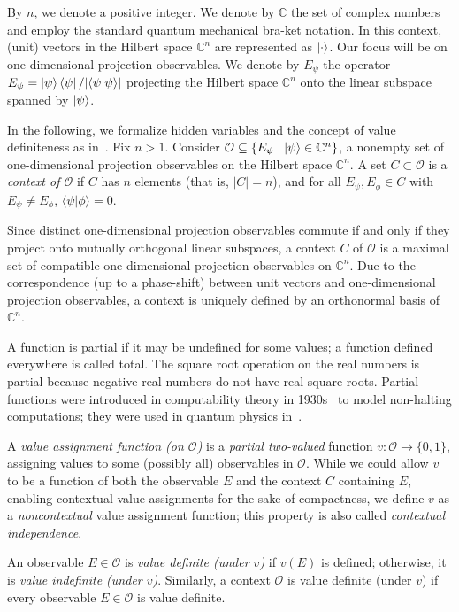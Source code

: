 \documentclass[%
 superscriptaddress,
  preprint,
 showpacs,
 showkeys,
 nofootinbib,
  amsmath,amssymb,
  aps,
 pra,
  longbibliography,
  floatfix,
 ]{revtex4-2}
\theoremstyle{definition}
\newcommand{\C}{\mathbb{C}}
\newcommand{\iprod}[2]{\langle #1 | #2 \rangle}
\begin{document}
By $n$, we denote a positive integer.
We denote by $\C$ the set of complex numbers and employ the standard quantum mechanical bra-ket notation. In this context, (unit) vectors in the Hilbert space $\C^n$ are represented as $\ket{\cdot}$.
Our focus will be on one-dimensional projection observables.
We denote by $E_\psi$ the operator $E_\psi=\ket{\psi}\bra{\psi}/\vert \iprod{\psi}{\psi}\vert$ projecting the Hilbert space $\C^n$ onto the linear subspace spanned by $\ket{\psi}$.


In the following, we formalize hidden variables and the concept of value definiteness as in~\cite{2015-AnalyticKS}.
Fix $n>1$. Consider $\mathcal{O} \subseteq \{ E_\psi \mid \ket{\psi} \in \mathbb{C}^n \}$, a nonempty set of one-dimensional projection observables on the Hilbert space $\mathbb{C}^n$.
        A set $C \subset \mathcal{O}$ is a {\it context of $\mathcal{O}$} if $C$ has $n$ elements (that is, $|C|=n$), and for all $E_\psi, E_\phi \in C$ with $E_\psi \neq E_\phi$, $\iprod{\psi}{\phi}=0$.


Since distinct one-dimensional projection observables commute if and only if they project onto mutually orthogonal linear subspaces, a context $C$ of $\mathcal{O}$ is a maximal set of compatible one-dimensional projection observables on $\C^n$. Due to the correspondence (up to a phase-shift) between unit vectors and one-dimensional projection observables, a context is uniquely defined by an orthonormal basis of $\C^n$.

A function is partial if it may be undefined for some values; a function
defined everywhere is called total. The square root operation on the real numbers is partial
 because negative real numbers do not have real square roots.
Partial functions were introduced in
computability theory in 1930s~\cite{davis-58}
to model non-halting computations; they were used in quantum physics in~\cite{2012-incomput-proofsCJ}.

        A {\it value assignment function (on $\mathcal{O}$)} is a {\it partial two-valued} function $v: \mathcal{O} \to \{0,1\}$,
assigning values to some (possibly all) observables in $\mathcal{O}$.
While we could allow $v$ to be a function of both the observable $E$ and the context $C$ containing $E$,
enabling contextual value assignments for the sake of compactness,
we define $v$ as a {\it noncontextual} value assignment function; this property is also called {\it contextual independence}.

        An observable $E \in \mathcal{O}$ is {\it value definite (under $v$)} if $v(E)$ is defined;
otherwise, it is {\it value indefinite (under $v$)}.
Similarly, a context $\mathcal{O}$ is value definite (under $v$) if every observable $E \in \mathcal{O}$ is value definite.
\end{document}
